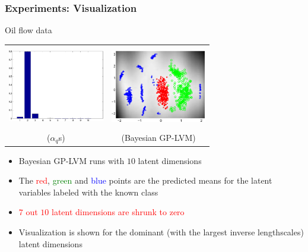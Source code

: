 \documentclass{beamer}
\begin{document}
\frame
{
\frametitle{Experiments: Visualization}

Oil flow data 

\begin{center}
\begin{tabular}{cc}
\includegraphics[width=42mm,height=35.5mm]
{../../../vargplvm/tex/diagrams/demOilVargplvmLengthScales1}&
\includegraphics[width=42mm,height=35.5mm]
{../../../vargplvm/tex/diagrams/demOilVargplvm1}\\
($\alpha_q$s) & (Bayesian GP-LVM) 
\end{tabular}
\end{center}

\begin{itemize}


\item Bayesian GP-LVM runs with $10$ latent dimensions

\item The \textcolor{red}{red}, \textcolor{green}{green} and 
     \textcolor{blue}{blue} points are the predicted
     means for the latent variables labeled with the known class 

\item \textcolor{red}{$7$ out $10$ latent dimensions are shrunk to zero} 

\item Visualization is shown for the dominant (with the largest
  inverse lengthscales) latent dimensions 

\end{itemize}   

}
\end{document}
